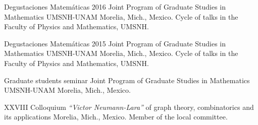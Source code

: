     {Degustaciones Matemáticas 2016}
    {
    {Joint Program of Graduate Studies in Mathematics UMSNH-UNAM}%
    }
    {
    {Morelia, Mich., Mexico.}%
    }
    {}
    {
    {Cycle of talks in the Faculty of Physics and Mathematics, UMSNH.}%
    }

    {Degustaciones Matemáticas 2015}
    {
    {Joint Program of Graduate Studies in Mathematics UMSNH-UNAM}%
    }
    {
    {Morelia, Mich., Mexico.}%
    }
    {}
    {
    {Cycle of talks in the Faculty of Physics and Mathematics, UMSNH.}%
    }



    {
    {Graduate students seminar}%
    }
    {
    {Joint Program of Graduate Studies in Mathematics UMSNH-UNAM}%
    }
    {
    {Morelia, Mich., Mexico.}
    }
    {}
    {}

    {
    {XXVIII Colloquium \textit{``Victor Neumann-Lara''} of graph theory, combinatorics and its applications}%
    }
    {}
    {
    {Morelia, Mich., Mexico.}%
    }
    {}
    {
    {Member of the local committee.}%
    }

    



